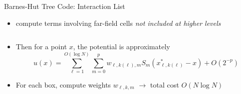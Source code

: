 \documentclass{beamer}
\newcommand{\pr}[1]{\left(#1\right)}
\begin{document}
\begin{frame}{Barnes-Hut Tree Code: Interaction List}
  \pause
  \begin{itemize}
  \item compute terms involving far-field cells \emph{not included at higher levels}
  \pause
  \begin{columns}
    \begin{column}{0.5\textwidth}
      \begin{figure}
        \begin{center}
        \texttt{[image: \{interaction\_list]}.pdf}
        \end{center}
        \label{fig:interaction_list}
        \end{figure}
    \end{column}
    \begin{column}{0.5\textwidth}
      \begin{figure}
        \begin{center}
          }
        \end{center}
      \end{figure}
    \end{column}
  \end{columns}
  \pause
  \item Then for a point $x$, the potential is approximately
    \[
    u(x) = \sum_{\ell=1}^{O(\log N)}\sum_{m=0}^p w_{\ell,k(\ell),m} S_m\pr{x_{\ell, k(\ell)}^* - x} + O\pr{2^{-p}}
    \]
  \pause
  \item For each box, compute weights $w_{\ell,k,m}$ $\longrightarrow$ total cost $O(N\log N)$
  \end{itemize}

  
\end{frame}
\end{document}
